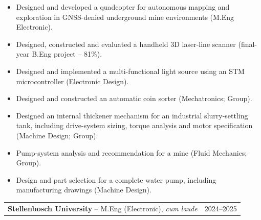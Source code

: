 \documentclass[10pt,a4paper]{article}
\newcommand{\sectiontitle}[1]{%
  \vspace{1.8em}%
  \noindent{\Large\color{maintext}\MakeUppercase{#1}}\par\vspace{0.25em}%
  \noindent{\color{lightline}\hrule height 0.6pt}\vspace{0.55em}%
}
\begin{document}
  \begin{itemize}
    \item Designed and developed a quadcopter for autonomous mapping and exploration in GNSS-denied underground mine environments (M.Eng Electronic).
    \item Designed, constructed and evaluated a handheld 3D laser-line scanner (final-year B.Eng project -- 81\%).
    \item Designed and implemented a multi-functional light source using an STM microcontroller (Electronic Design).
    \item Designed and constructed an automatic coin sorter (Mechatronics; Group).
    \item Designed an internal thickener mechanism for an industrial slurry-settling tank, including drive-system sizing, torque analysis and motor specification (Machine Design; Group).
    \item Pump-system analysis and recommendation for a mine (Fluid Mechanics; Group).
    \item Design and part selection for a complete water pump, including manufacturing drawings (Machine Design).
  \end{itemize}








  \sectiontitle{Education}

    \noindent\begin{tabularx}{\linewidth}{>{\raggedright\arraybackslash}X r}
      \textbf{Stellenbosch University} -- M.Eng (Electronic), \textit{cum laude} & 2024--2025 \\
    \end{tabularx}
\end{document}

